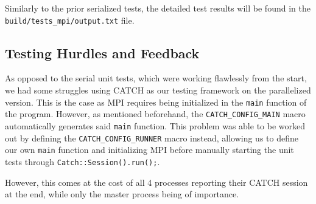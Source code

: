 \documentclass[11pt]{article}
\begin{document}
Similarly to the prior serialized tests, the detailed test results will be found in the \\\texttt{build/tests\_mpi/output.txt} file.

\subsection{Testing Hurdles and Feedback}
As opposed to the serial unit tests, which were working flawlessly from the start, we had some struggles using CATCH as our testing framework on the parallelized version. This is the case as MPI requires being initialized in the \texttt{main} function of the program. However, as mentioned beforehand, the \texttt{CATCH\_CONFIG\_MAIN} macro automatically generates said \texttt{main} function. This problem was able to be worked out by defining the \texttt{CATCH\_CONFIG\_RUNNER} macro instead, allowing us to define our own \texttt{main} function and initializing MPI before manually starting the unit tests through \texttt{Catch::Session().run();}.

However, this comes at the cost of all 4 processes reporting their CATCH session at the end, while only the master process being of importance.
\end{document}

